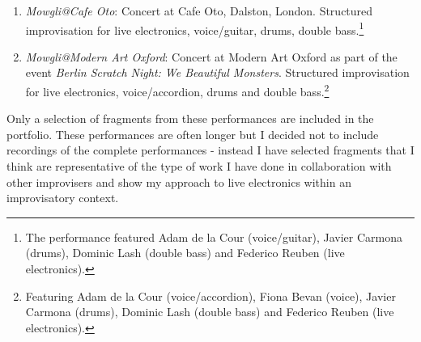 \begin{enumerate}
\item \emph{Mowgli@Cafe Oto}: Concert at Cafe Oto, Dalston, London. Structured improvisation for live electronics, voice/guitar, drums, double bass.\footnote{The performance featured Adam de la Cour (voice/guitar), Javier Carmona (drums), Dominic Lash (double bass) and Federico Reuben (live electronics).}
\item \emph{Mowgli@Modern Art Oxford}: Concert at Modern Art Oxford as part of the event \emph{Berlin Scratch Night: We Beautiful Monsters}. Structured improvisation for live electronics, voice/accordion, drums and double bass.\footnote{Featuring Adam de la Cour (voice/accordion), Fiona Bevan (voice), Javier Carmona (drums), Dominic Lash (double bass) and Federico Reuben (live electronics).}
\end{enumerate}
Only a selection of fragments from these performances are included in the portfolio. These performances are often longer but I decided not to include recordings of the complete performances - instead I have selected fragments that I think are representative of the type of work I have done in collaboration with other improvisers and show my approach to live electronics within an improvisatory context.

\label{ch:compositions}